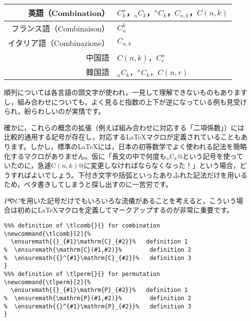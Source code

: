 \documentclass[autodetect-engine,dvipdfmx]{jsarticle}
\begin{document}
\begin{table}[h]

\begin{tabular}{rl}
\hline
英語（Combination）&$C_{k}^{n}$，$_{n}C_{k}$，$^{n}C_{k}$，$C_{n,k}$，$C(n,k)$\\\hline
フランス語（Combinaison）&$C_{n}^{k}$\\\hline
イタリア語（Combinazione）&$C_{n,k}$\\\hline
中国語&$C(n,k)$，$C_{r}^{n}$\\\hline
韓国語&$_{n}C_{k}$，$^{n}C_{k}$，$C(n,r)$\\\hline
\end{tabular}

\end{table}

順列については各言語の頭文字が使われ，一見して理解できないものもありますし，組み合わせについても，よく見ると指数の上下が逆になっている例も見受けられ，紛らわしいのが実情です。

確かに，これらの概念の拡張（例えば組み合わせに対応する「二項係数」）には比較的通用する記号が存在し，対応する\LaTeX マクロが定義されていることもあります。しかし，標準の\LaTeX には，日本の初等数学でよく使われる記法を簡略化するマクロがありません。仮に「長文の中で何度も\verb@${}_n \mathrm{C}_k$@という記号を使っていたのに，急遽\verb@$\mathrm{C}(n,k)$@に変更しなければならなくなった！」という場合，どうすればよいでしょう。下付き文字や括弧といったありふれた記法だけを用いるため，ベタ書きしてしまうと探し出すのに一苦労です。

$P$や$C$を用いた記号だけでもいろいろな流儀があることを考えると，こういう場合は初めに\LaTeX マクロを定義してマークアップするのが非常に重要です。

\begin{tcolorbox}

\begin{verbatim}
%%% definition of \tlcomb{}{} for combination
\newcommand{\tlcomb}[2]{%
  \ensuremath{{}_{#1}\mathrm{C}_{#2}}%   definition 1
%  \ensuremath{\mathrm{C}(#1,#2)}%        definition 2
%  \ensuremath{{}^{#1}\mathrm{C}_{#2}}%   definition 3
}
%%% definition of \tlperm{}{} for permutation
\newcommand{\tlperm}[2]{%
  \ensuremath{{}_{#1}\mathrm{P}_{#2}}%   definition 1
%  \ensuremath{\mathrm{P}(#1,#2)}%        definition 2
%  \ensuremath{{}^{#1}\mathrm{P}_{#2}}%   definition 3
}
\end{verbatim}

\end{tcolorbox}
\end{document}
